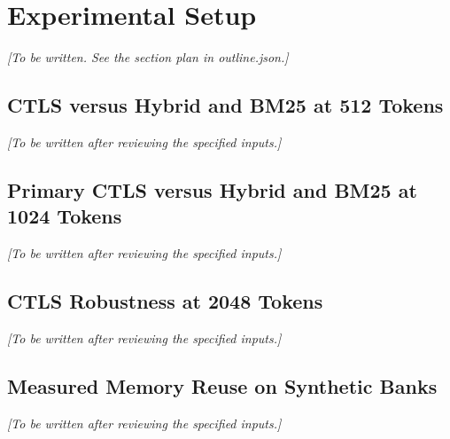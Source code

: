 \section{Experimental Setup}
\label{sec:experiments}
\textit{[To be written. See the section plan in outline.json.]}
\subsection{CTLS versus Hybrid and BM25 at 512 Tokens}
\label{sec:setup_fair_baselines_512}
\textit{[To be written after reviewing the specified inputs.]}
\subsection{Primary CTLS versus Hybrid and BM25 at 1024 Tokens}
\label{sec:setup_fair_baselines}
\textit{[To be written after reviewing the specified inputs.]}
\subsection{CTLS Robustness at 2048 Tokens}
\label{sec:setup_protocol_replication}
\textit{[To be written after reviewing the specified inputs.]}
\subsection{Measured Memory Reuse on Synthetic Banks}
\label{sec:setup_memory_reuse}
\textit{[To be written after reviewing the specified inputs.]}
